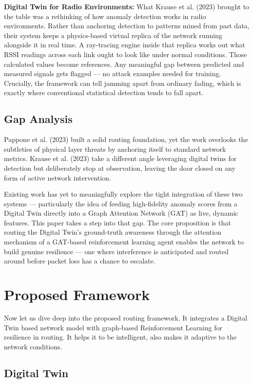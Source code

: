\documentclass[conference]{IEEEtran}
\begin{document}
\textbf{Digital Twin for Radio Environments:} What Krause et al. (2023) brought to the table was a rethinking of how anomaly detection works in radio environments. Rather than anchoring detection to patterns mined from past data, their system keeps a physics-based virtual replica of the network running alongside it in real time. A ray-tracing engine inside that replica works out what RSSI readings across each link ought to look like under normal conditions. Those calculated values become references. Any meaningful gap between predicted and measured signals gets flagged — no attack examples needed for training. Crucially, the framework can tell jamming apart from ordinary fading, which is exactly where conventional statistical detection tends to fall apart.

\subsection{Gap Analysis}

Pappone et al. (2023) built a solid routing foundation, yet the work overlooks the subtleties of physical layer threats by anchoring itself to standard network metrics. Krause et al. (2023) take a different angle leveraging digital twins for detection but deliberately stop at observation, leaving the door closed on any form of active network intervention.

Existing work has yet to meaningfully explore the tight integration of these two systems — particularly the idea of feeding high-fidelity anomaly scores from a Digital Twin directly into a Graph Attention Network (GAT) as live, dynamic features. This paper takes a step into that gap. The core proposition is that routing the Digital Twin's ground-truth awareness through the attention mechanism of a GAT-based reinforcement learning agent enables the network to build genuine resilience — one where interference is anticipated and routed around before packet loss has a chance to escalate.
\section{Proposed Framework}

Now let us dive deep into the proposed routing framework. It integrates a Digital Twin based network model with graph-based Reinforcement Learning for resilience in routing. It helps it to be intelligent, also makes it adaptive to the network conditions.

\subsection{Digital Twin}
\end{document}
